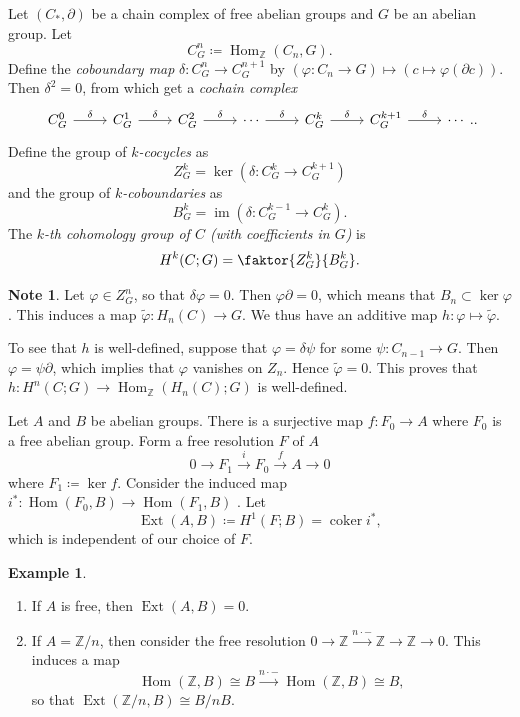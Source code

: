 \documentclass[10pt,letterpaper,cm]{nupset}
\theoremstyle{definition}
\newtheorem{exmp}[definition]{Example}
\newtheorem{note}[definition]{Note}
\theoremstyle{theorem}
\theoremstyle{remark}
\newcommand{\Z}{\mathbb Z}
\newcommand{\1}{\mathbb{1}}
\newcommand{\0}{\vec 0}
\DeclareMathOperator{\im}{im}
\DeclareMathOperator{\ext}{Ext}
\DeclareMathOperator{\Hom}{Hom}
\DeclareMathOperator{\coker}{coker}
\begin{document}
Let $\left(C_{\ast}, \partial\right)$ be a chain complex of free abelian groups and $G$ be an abelian group. Let $$C_G^n \coloneqq  \Hom_{\Z}(C_n, G).$$ Define the \textit{coboundary map} $\delta : C_G^n \to C_G^{n+1}$ by $\left(\varphi : C_n \to G\right) \mapsto \left(c\mapsto \varphi(\partial{c})\right)$. Then $\delta^2 =0$, from which get a \textit{cochain complex}
\[
\begin{tikzcd}
C_G^0 \arrow[r, "\delta"] & C_G^1 \arrow[r, "\delta"] & C_G^2 \arrow[r, "\delta"] & \cdots \arrow[r, "\delta"] & C_G^k \arrow[r, "\delta"] & C_G^{k+1} \arrow[r, "\delta"] & \cdots
\end{tikzcd}.
.\] Define the group of \textit{$k$-cocycles} as  $$Z_G^k = \ker(\delta: C_G^k \to C_G^{k+1})$$ and the group of \textit{$k$-coboundaries} as $$ B_G^k = \im(\delta : C_G^{k-1} \to C_G^k)  .$$ The \textit{$k$-th cohomology group of $C$ (with coefficients in $G$)} is $$H^k(C; G) = \faktor{ Z_G^k  }{B_G^k   }  .$$


\begin{note} 
 Let $\varphi \in Z_G^n$, so that $\delta{\varphi}=0$. Then $\varphi{\partial} =0$, which means that $B_n\subset \ker{\varphi}$. This induces a map $\tilde{\varphi} : H_n(C) \to G$.  We thus have an additive map $h: \varphi \mapsto \tilde{\varphi}$.

To see that $h$ is well-defined, suppose that $\varphi = \delta{\psi}$ for some $\psi : C_{n-1} \to G$. Then $\varphi = \psi{\partial}$, which implies that $\varphi$ vanishes on $Z_n$. Hence $\tilde{\varphi} =0$. This proves that $h: H^n(C; G) \to  \Hom_{\Z}(H_n(C); G)$ is well-defined.
\end{note}

\medskip

 Let $A$ and $B$ be abelian groups. There is a surjective map $f: F_0 \to A$ where $F_0$ is a free abelian group. Form a free resolution $F$ of $A$ $$0 \to F_1 \overset{i}{\longrightarrow} F_0 \overset{f}{\longrightarrow} A \to 0$$ where $F_1 \coloneqq  \ker{f}$. Consider the induced map $i^{\ast} : \Hom(F_0, B) \to \Hom(F_1, B)$ . Let $$\ext(A, B) \coloneqq  H^1(F; B) = \coker{i^{\ast}},$$ which is independent of our choice of $F$.

\begin{exmp} $ $
\begin{enumerate}
\item If $A$ is free, then $\ext(A, B) =0$. 
\item If $A = \Z/n$, then consider the free resolution $0 \to \Z \overset{n\cdot{-}}{\longrightarrow} \Z \to \Z \to 0$. This induces a map $$\Hom(\Z, B) \cong B \overset{n\cdot{-}}{\longrightarrow} \Hom(\Z, B) \cong B,$$ so that $\ext(\Z/n, B) \cong B/nB$.
\end{enumerate}
\end{exmp}
\end{document}
